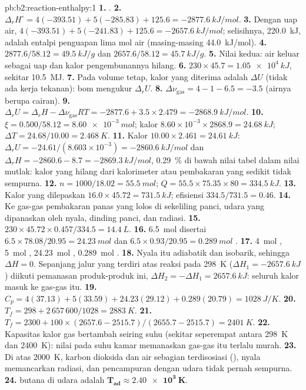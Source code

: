 \begin{solution}{pb:b2:reaction-enthalpy:1}
\textbf{1.} .
\textbf{2.} $\Delta_r H^\circ = 4(-393.51) + 5(-285.83) + 125.6 =
\qty{-2877.6}{kJ/mol}$.
\textbf{3.} Dengan uap air, $4(-393.51) + 5(-241.83) + 125.6 =
\qty{-2657.6}{kJ/mol}$; selisihnya, \qty{220.0}{kJ}, adalah entalpi
penguapan lima mol air (masing-masing \qty{44.0}{kJ/mol}).
\textbf{4.} $2877.6/58.12 = \qty{49.5}{kJ/g}$ dan $2657.6/58.12 =
\qty{45.7}{kJ/g}$.
\textbf{5.} Nilai kedua: air keluar sebagai uap dan kalor pengembunannya
hilang.
\textbf{6.} $230 \times 45.7 = \qty{1.05e4}{kJ}$, sekitar \qty{10.5}{MJ}.
\textbf{7.} Pada volume tetap, kalor yang diterima adalah $\Delta U$ (tidak
ada kerja tekanan): bom mengukur $\Delta_r U$.
\textbf{8.} $\Delta\nu_{\text{gas}} = 4 - 1 - 6.5 = -3.5$ (airnya berupa
cairan).
\textbf{9.} $\Delta_r U = \Delta_r H - \Delta\nu_{\text{gas}}RT = -2877.6 +
3.5 \times 2.479 = \qty{-2868.9}{kJ/mol}$.
\textbf{10.} $\xi = 0.500/58.12 = \qty{8.60e-3}{mol}$; kalor $8.60 \times
10^{-3} \times 2868.9 = \qty{24.68}{kJ}$; $\Delta T = 24.68/10.00 =
\qty{2.468}{K}$.
\textbf{11.} Kalor $10.00 \times 2.461 = \qty{24.61}{kJ}$: $\Delta_r U =
-24.61/(8.603 \times 10^{-3}) = \qty{-2860.6}{kJ/mol}$ dan $\Delta_r H =
-2860.6 - 8.7 = \qty{-2869.3}{kJ/mol}$, \qty{0.29}{\percent} di bawah nilai
tabel dalam nilai mutlak: kalor yang hilang dari kalorimeter atau
pembakaran yang sedikit tidak sempurna.
\textbf{12.} $n = 1000/18.02 = \qty{55.5}{mol}$; $Q = 55.5 \times 75.35
\times 80 = \qty{334.5}{kJ}$.
\textbf{13.} Kalor yang dilepaskan $16.0 \times 45.72 = \qty{731.5}{kJ}$;
efisiensi $334.5/731.5 = 0.46$.
\textbf{14.} Ke gas-gas pembakaran panas yang lolos di sekeliling panci,
udara yang dipanaskan oleh nyala, dinding panci, dan radiasi.
\textbf{15.} $230 \times 45.72 \times 0.457/334.5 = \qty{14.4}{L}$.
\textbf{16.} \qty{6.5}{mol}  disertai $6.5 \times 78.08/20.95 =
\qty{24.23}{mol}$  dan $6.5 \times 0.93/20.95 = \qty{0.289}{mol}$
.
\textbf{17.} \qty{4}{mol} , \qty{5}{mol} ,
\qty{24.23}{mol} , \qty{0.289}{mol} .
\textbf{18.} Nyala itu adiabatik dan isobarik, sehingga $\Delta H = 0$.
Sepanjang jalur yang terdiri atas reaksi pada \qty{298}{K}
($\Delta H_1 =
\qty{-2657.6}{kJ}$) diikuti pemanasan produk-produk ini,
$\Delta H_2 =
-\Delta H_1 = \qty{+2657.6}{kJ}$: seluruh kalor masuk ke
gas-gas itu.
\textbf{19.} $C_p = 4(37.13) + 5(33.59) + 24.23(29.12) + 0.289(20.79) =
\qty{1028}{J/K}$.
\textbf{20.} $T_f = 298 + 2\,657\,600/1028 = \qty{2883}{K}$.
\textbf{21.} $T_f = 2300 + 100 \times (2657.6 - 2515.7)/(2655.7 - 2515.7) =
\qty{2401}{K}$.
\textbf{22.} Kapasitas kalor gas bertambah seiring suhu (sekitar
seperempat antara \qty{298}{K} dan \qty{2400}{K}): nilai pada suhu kamar
memanaskan gas-gas itu terlalu murah.
\textbf{23.} Di atas \qty{2000}{K}, karbon dioksida dan air sebagian
terdisosiasi (), nyala memancarkan radiasi, dan pencampuran dengan
udara tidak pernah sempurna.
\textbf{24.}  butana di udara adalah
$\boldsymbol{T_{\text{ad}} \approx \qty{2.40e3}{K}}$.
\end{solution}
